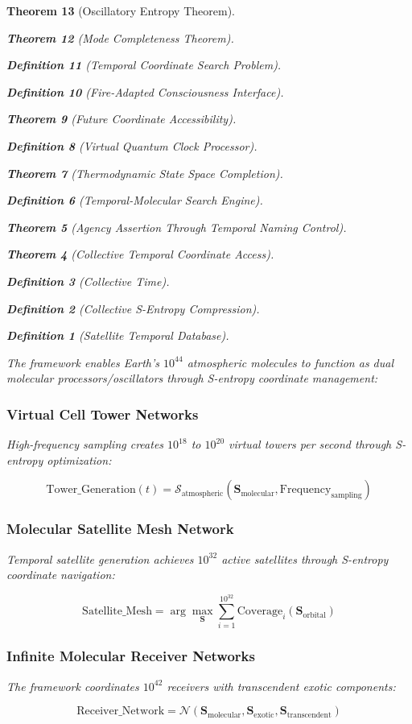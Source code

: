 \documentclass[12pt,a4paper]{article}
\newtheorem{theorem}{Theorem}[section]
\newtheorem{definition}[theorem]{Definition}
\begin{document}
\begin{theorem}[Oscillatory Entropy Theorem]
\begin{theorem}[Mode Completeness Theorem]
\begin{enumerate}
\begin{definition}[Temporal Coordinate Search Problem]
\begin{algorithm}
\begin{definition}[Fire-Adapted Consciousness Interface]
\begin{theorem}[Future Coordinate Accessibility]
\begin{definition}[Virtual Quantum Clock Processor]
\begin{itemize}
\begin{itemize}
\begin{theorem}[Thermodynamic State Space Completion]
\begin{definition}[Temporal-Molecular Search Engine]
\begin{theorem}[Agency Assertion Through Temporal Naming Control]
\begin{remark}
\begin{theorem}[Collective Temporal Coordinate Access]
\begin{definition}[Collective Time]
\begin{definition}[Collective S-Entropy Compression]
\begin{definition}[Satellite Temporal Database]
\begin{algorithm}
\begin{table}[h]
{{The framework enables Earth's $10^{44}$ atmospheric molecules to function as dual molecular processors/oscillators through S-entropy coordinate management:

\subsubsection{Virtual Cell Tower Networks}

High-frequency sampling creates $10^{18}$ to $10^{20}$ virtual towers per second through S-entropy optimization:

\begin{equation}
\text{Tower\_Generation}(t) = \mathcal{S}_{\text{atmospheric}}(\mathbf{S}_{\text{molecular}}, \text{Frequency}_{\text{sampling}})
\end{equation}

\subsubsection{Molecular Satellite Mesh Network}

Temporal satellite generation achieves $10^{32}$ active satellites through S-entropy coordinate navigation:

\begin{equation}
\text{Satellite\_Mesh} = \arg\max_{\mathbf{S}} \sum_{i=1}^{10^{32}} \text{Coverage}_i(\mathbf{S}_{\text{orbital}})
\end{equation}

\subsubsection{Infinite Molecular Receiver Networks}

The framework coordinates $10^{42}$ receivers with transcendent exotic components:

\begin{equation}
\text{Receiver\_Network} = \mathcal{N}(\mathbf{S}_{\text{molecular}}, \mathbf{S}_{\text{exotic}}, \mathbf{S}_{\text{transcendent}})
\end{equation}

}}
\end{table}
\end{algorithm}
\end{definition}
\end{definition}
\end{definition}
\end{theorem}
\end{remark}
\end{theorem}
\end{definition}
\end{theorem}
\end{itemize}
\end{itemize}
\end{definition}
\end{theorem}
\end{definition}
\end{algorithm}
\end{definition}
\end{enumerate}
\end{theorem}
\end{theorem}
\end{document}
